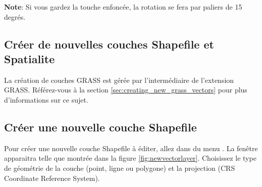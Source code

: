 \textbf{Note}: Si vous gardez la touche  enfoncée, la rotation 
se fera par paliers de 15 degrés.

\subsection{Créer de nouvelles couches Shapefile et Spatialite}\label{sec:create 
shape}

La création de couches GRASS est gérée par l'intermédiaire de l'extension GRASS. 
Référez-vous à la section \ref{sec:creating_new_grass_vectors} pour plus 
d'informations sur ce sujet.

\subsection{Créer une nouvelle couche Shapefile}\label{sec:create shape}

Pour créer une nouvelle couche Shapefile à éditer, allez dans 
 du menu 
. La fenêtre  apparaitra 
telle que montrée dans la figure \ref{fig:newvectorlayer}. Choisissez le type de 
géométrie de la couche (point, ligne ou polygone) et la projection (CRS Coordinate 
Reference System).

